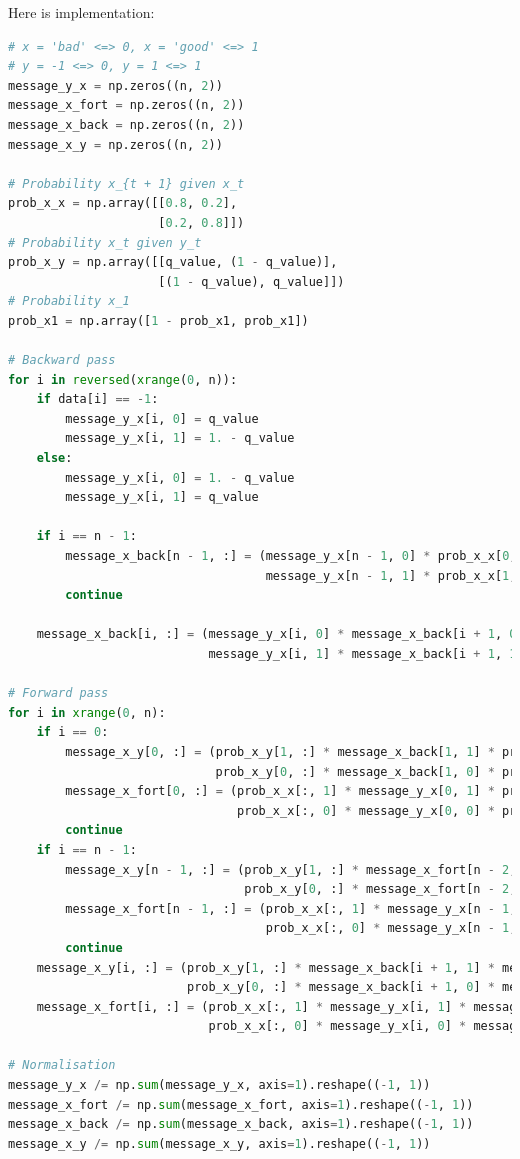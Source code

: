 \documentclass[a4paper]{article}
\begin{document}
Here is implementation:
\begin{lstlisting}[language=Python]
# x = 'bad' <=> 0, x = 'good' <=> 1
# y = -1 <=> 0, y = 1 <=> 1
message_y_x = np.zeros((n, 2))
message_x_fort = np.zeros((n, 2))
message_x_back = np.zeros((n, 2))
message_x_y = np.zeros((n, 2))

# Probability x_{t + 1} given x_t
prob_x_x = np.array([[0.8, 0.2],
                     [0.2, 0.8]])
# Probability x_t given y_t
prob_x_y = np.array([[q_value, (1 - q_value)],
                     [(1 - q_value), q_value]])
# Probability x_1
prob_x1 = np.array([1 - prob_x1, prob_x1])

# Backward pass
for i in reversed(xrange(0, n)):
    if data[i] == -1:
        message_y_x[i, 0] = q_value
        message_y_x[i, 1] = 1. - q_value
    else:
        message_y_x[i, 0] = 1. - q_value
        message_y_x[i, 1] = q_value

    if i == n - 1:
        message_x_back[n - 1, :] = (message_y_x[n - 1, 0] * prob_x_x[0, :] +
                                    message_y_x[n - 1, 1] * prob_x_x[1, :])
        continue

    message_x_back[i, :] = (message_y_x[i, 0] * message_x_back[i + 1, 0] * prob_x_x[0, :] +
                            message_y_x[i, 1] * message_x_back[i + 1, 1] * prob_x_x[1, :])

# Forward pass
for i in xrange(0, n):
    if i == 0:
        message_x_y[0, :] = (prob_x_y[1, :] * message_x_back[1, 1] * prob_x1[1] +
                             prob_x_y[0, :] * message_x_back[1, 0] * prob_x1[0])
        message_x_fort[0, :] = (prob_x_x[:, 1] * message_y_x[0, 1] * prob_x1[1] +
                                prob_x_x[:, 0] * message_y_x[0, 0] * prob_x1[0])
        continue
    if i == n - 1:
        message_x_y[n - 1, :] = (prob_x_y[1, :] * message_x_fort[n - 2, 1] +
                                 prob_x_y[0, :] * message_x_fort[n - 2, 0])
        message_x_fort[n - 1, :] = (prob_x_x[:, 1] * message_y_x[n - 1, 1] * message_x_fort[n - 2, 1] +
                                    prob_x_x[:, 0] * message_y_x[n - 1, 0] * message_x_fort[n - 2, 0])
        continue
    message_x_y[i, :] = (prob_x_y[1, :] * message_x_back[i + 1, 1] * message_x_fort[i - 1, 1] +
                         prob_x_y[0, :] * message_x_back[i + 1, 0] * message_x_fort[i - 1, 0])
    message_x_fort[i, :] = (prob_x_x[:, 1] * message_y_x[i, 1] * message_x_fort[i - 1, 1] +
                            prob_x_x[:, 0] * message_y_x[i, 0] * message_x_fort[i - 1, 0])

# Normalisation
message_y_x /= np.sum(message_y_x, axis=1).reshape((-1, 1))
message_x_fort /= np.sum(message_x_fort, axis=1).reshape((-1, 1))
message_x_back /= np.sum(message_x_back, axis=1).reshape((-1, 1))
message_x_y /= np.sum(message_x_y, axis=1).reshape((-1, 1))
\end{lstlisting}
\end{document}
